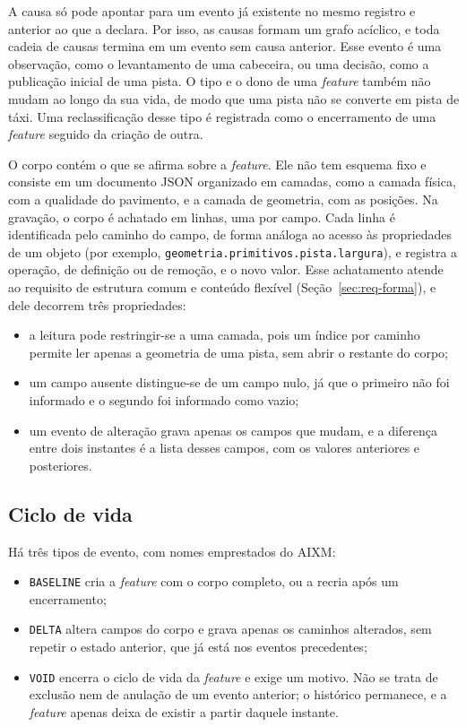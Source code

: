 A causa só pode apontar para um evento já existente no mesmo registro e anterior ao que a declara. Por isso, as causas formam um grafo acíclico, e toda cadeia de causas termina em um evento sem causa anterior. Esse evento é uma observação, como o levantamento de uma cabeceira, ou uma decisão, como a publicação inicial de uma pista. O tipo e o dono de uma \textit{feature} também não mudam ao longo da sua vida, de modo que uma pista não se converte em pista de táxi. Uma reclassificação desse tipo é registrada como o encerramento de uma \textit{feature} seguido da criação de outra.

O corpo contém o que se afirma sobre a \textit{feature}. Ele não tem esquema fixo e consiste em um documento JSON organizado em camadas, como a camada física, com a qualidade do pavimento, e a camada de geometria, com as posições. Na gravação, o corpo é achatado em linhas, uma por campo. Cada linha é identificada pelo caminho do campo, de forma análoga ao acesso às propriedades de um objeto (por exemplo, \texttt{geometria.primitivos.pista.largura}), e registra a operação, de definição ou de remoção, e o novo valor. Esse achatamento atende ao requisito de estrutura comum e conteúdo flexível (Seção~\ref{sec:req-forma}), e dele decorrem três propriedades:
\begin{itemize}
    \item a leitura pode restringir-se a uma camada, pois um índice por caminho permite ler apenas a geometria de uma pista, sem abrir o restante do corpo;
    \item um campo ausente distingue-se de um campo nulo, já que o primeiro não foi informado e o segundo foi informado como vazio;
    \item um evento de alteração grava apenas os campos que mudam, e a diferença entre dois instantes é a lista desses campos, com os valores anteriores e posteriores.
\end{itemize}

\subsection{Ciclo de vida}\label{sec:ciclo-vida}

Há três tipos de evento, com nomes emprestados do AIXM:
\begin{itemize}
    \item \texttt{BASELINE} cria a \textit{feature} com o corpo completo, ou a recria após um encerramento;
    \item \texttt{DELTA} altera campos do corpo e grava apenas os caminhos alterados, sem repetir o estado anterior, que já está nos eventos precedentes;
    \item \texttt{VOID} encerra o ciclo de vida da \textit{feature} e exige um motivo. Não se trata de exclusão nem de anulação de um evento anterior; o histórico permanece, e a \textit{feature} apenas deixa de existir a partir daquele instante.
\end{itemize}

